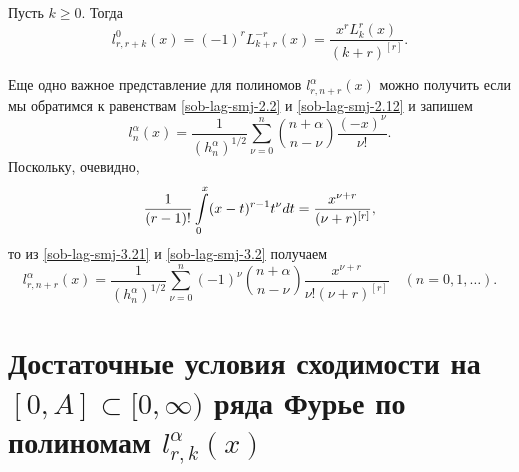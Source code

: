 \begin{corollary}\label{lag-repr}
Пусть  $k\ge0$. Тогда
$$
l_{r,r+k}^{0}(x)=(-1)^rL_{k+r}^{-r}(x)=\frac{x^{r}L_{k}^{r}(x)}{(k+r)^{[r]}}.
$$
\end{corollary}

Еще одно важное представление для полиномов $l_{r,n+r}^{\alpha}(x)$ можно получить если мы обратимся к равенствам \eqref{sob-lag-smj-2.2} и \eqref{sob-lag-smj-2.12} и запишем
\begin{equation}\label{sob-lag-smj-3.21}
l_n^\alpha(x) =\frac{1}{(h_n^\alpha)^{1/2}}
\sum\limits_{\nu=0}^{n}
\binom{n+\alpha}{n-\nu}
\frac{(-x)^\nu}{\nu!}.
\end{equation}
Поскольку, очевидно,
\begin{equation*}
{1\over (r-1)!}\int\limits_{0}^x(x-t)^{r-1}t^\nu dt=\frac{x^{\nu+r}}{(\nu+r)^{[r]}},
\end{equation*}
то из \eqref{sob-lag-smj-3.21} и \eqref{sob-lag-smj-3.2} получаем
\begin{equation*}\label{sob-lag-smj-3.22}
l_{r,n+r}^{\alpha}(x)=
\frac{1}{(h_n^\alpha)^{1/2}}
\sum\limits_{\nu=0}^{n}(-1)^\nu \binom{n+\alpha}{n-\nu}
\frac{x^{\nu+r}}{\nu!(\nu+r)^{[r]}}\quad (n=0,1,\ldots).
\end{equation*}





\section{Достаточные условия сходимости на $[0,A]\subset[0,\infty)$ ряда Фурье по полиномам $l_{r,k}^{\alpha}(x)$ }

